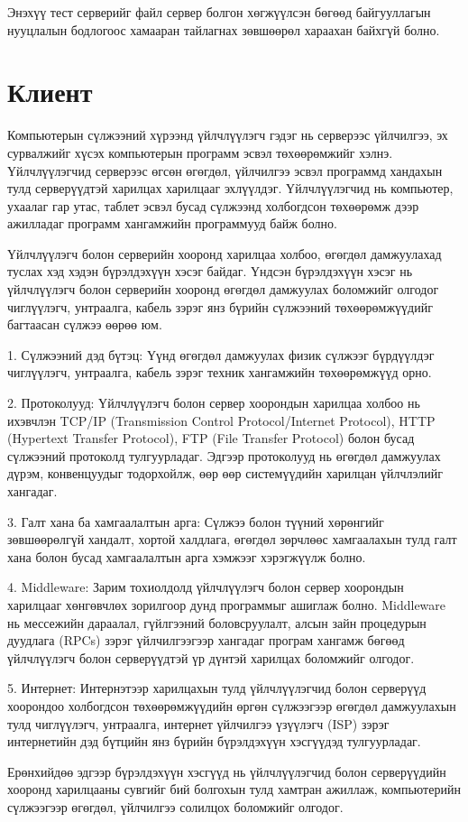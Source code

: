 Энэхүү тест серверийг файл сервер болгон хөгжүүлсэн бөгөөд байгууллагын нууцлалын бодлогоос хамааран тайлагнах зөвшөөрөл хараахан байхгүй болно.
\pagebreak
\section{Клиент}
Компьютерын сүлжээний хүрээнд үйлчлүүлэгч гэдэг нь серверээс үйлчилгээ, эх сурвалжийг хүсэх компьютерын программ эсвэл төхөөрөмжийг хэлнэ. Үйлчлүүлэгчид серверээс өгсөн өгөгдөл, үйлчилгээ эсвэл программд хандахын тулд серверүүдтэй харилцах харилцааг эхлүүлдэг. Үйлчлүүлэгчид нь компьютер, ухаалаг гар утас, таблет эсвэл бусад сүлжээнд холбогдсон төхөөрөмж дээр ажилладаг программ хангамжийн программууд байж болно.

Үйлчлүүлэгч болон серверийн хооронд харилцаа холбоо, өгөгдөл дамжуулахад туслах хэд хэдэн бүрэлдэхүүн хэсэг байдаг. Үндсэн бүрэлдэхүүн хэсэг нь үйлчлүүлэгч болон серверийн хооронд өгөгдөл дамжуулах боломжийг олгодог чиглүүлэгч, унтраалга, кабель зэрэг янз бүрийн сүлжээний төхөөрөмжүүдийг багтаасан сүлжээ өөрөө юм.

1. Сүлжээний дэд бүтэц: Үүнд өгөгдөл дамжуулах физик сүлжээг бүрдүүлдэг чиглүүлэгч, унтраалга, кабель зэрэг техник хангамжийн төхөөрөмжүүд орно.

2. Протоколууд: Үйлчлүүлэгч болон сервер хоорондын харилцаа холбоо нь ихэвчлэн TCP/IP (Transmission Control Protocol/Internet Protocol), HTTP (Hypertext Transfer Protocol), FTP (File Transfer Protocol) болон бусад сүлжээний протоколд тулгуурладаг. Эдгээр протоколууд нь өгөгдөл дамжуулах дүрэм, конвенцуудыг тодорхойлж, өөр өөр системүүдийн харилцан үйлчлэлийг хангадаг.

3. Галт хана ба хамгаалалтын арга: Сүлжээ болон түүний хөрөнгийг зөвшөөрөлгүй хандалт, хортой халдлага, өгөгдөл зөрчлөөс хамгаалахын тулд галт хана болон бусад хамгаалалтын арга хэмжээг хэрэгжүүлж болно.

4. Middleware: Зарим тохиолдолд үйлчлүүлэгч болон сервер хоорондын харилцааг хөнгөвчлөх зорилгоор дунд программыг ашиглаж болно. Middleware нь мессежийн дараалал, гүйлгээний боловсруулалт, алсын зайн процедурын дуудлага (RPCs) зэрэг үйлчилгээгээр хангадаг програм хангамж бөгөөд үйлчлүүлэгч болон серверүүдтэй үр дүнтэй харилцах боломжийг олгодог.

5. Интернет: Интернэтээр харилцахын тулд үйлчлүүлэгчид болон серверүүд хоорондоо холбогдсон төхөөрөмжүүдийн өргөн сүлжээгээр өгөгдөл дамжуулахын тулд чиглүүлэгч, унтраалга, интернет үйлчилгээ үзүүлэгч (ISP) зэрэг интернетийн дэд бүтцийн янз бүрийн бүрэлдэхүүн хэсгүүдэд тулгуурладаг.

Ерөнхийдөө эдгээр бүрэлдэхүүн хэсгүүд нь үйлчлүүлэгчид болон серверүүдийн хооронд харилцааны сувгийг бий болгохын тулд хамтран ажиллаж, компьютерийн сүлжээгээр өгөгдөл, үйлчилгээ солилцох боломжийг олгодог.

\pagebreak